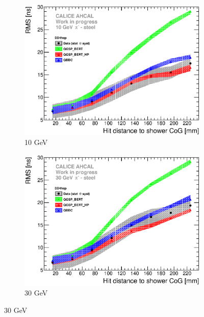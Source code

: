 \begin{figure}[htbp!]
  \begin{subfigure}[t]{0.49\textwidth}
    \centering
    \includegraphics[width=1\textwidth]{../Thesis_Plots/Timing/Pions/Plots/ComparisonToSim/RMS_Radius_10GeV_SSF_DD4hep.eps}
    \caption{10 GeV}\label{fig:Radius_SSF_RMS_SimData_10GeV_DD4hep}
  \end{subfigure}
  \hfill
  \begin{subfigure}[t]{0.49\textwidth}
    \centering
    \includegraphics[width=1\textwidth]{../Thesis_Plots/Timing/Pions/Plots/ComparisonToSim/RMS_Radius_30GeV_SSF_DD4hep.eps}
    \caption{30 GeV}\label{fig:Radius_SSF_RMS_SimData_30GeV_DD4hep}
  \end{subfigure}

\end{figure}
